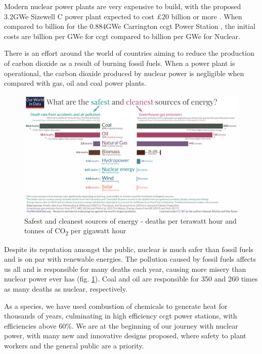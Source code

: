 Modern nuclear power plants are very expensive to build, with the proposed 3.2GWe Sizewell C power plant expected to cost £20 billion or more \cite{ftnppcost}.  When compared to  billion for the 0.884GWe Carrington \acrshort{ccgt} Power Station \cite{efgccgtcost}, the initial costs are  billion per GWe for \acrshort{ccgt} compared to  billion per GWe for Nuclear.

There is an effort around the world of countries aiming to reduce the production of carbon dioxide as a result of burning fossil fuels.  When a power plant is operational, the carbon dioxide produced by nuclear power is negligible when compared with gas, oil and coal power plants.  

\begin{figure}[tbp]
  \begin{center}
    \includegraphics[width=.95\linewidth]{chapters/introduction/images/safest.png}
    \caption{Safest and cleanest sources of energy \cite{deathsfromenergysource} - deaths per terawatt hour and tonnes of CO\textsubscript{2} per gigawatt hour}
    \label{fig:safestenergy}
  \end{center}
\end{figure}

Despite its reputation amongst the public, nuclear is much safer than fossil fuels and is on par with renewable energies.  The pollution caused by fossil fuels affects us all and is responsible for many deaths each year, causing more misery than nuclear power ever has (fig. \ref{fig:safestenergy}).  Coal and oil are responsible for 350 and 260 times as many deaths as nuclear, respectively.

As a species, we have used combustion of chemicals to generate heat for thousands of years, culminating in high efficiency \acrshort{ccgt} power stations, with efficiencies above 60\%.  We are at the beginning of our journey with nuclear power, with many new and innovative designs proposed, where safety to plant workers and the general public are a priority.

